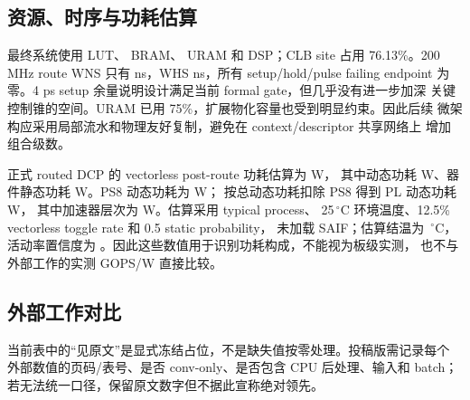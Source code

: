 \subsection{资源、时序与功耗估算}



最终系统使用 \LUTCount{} LUT、\BRAMCount{} BRAM、\URAMCount{} URAM 和
\DSPCount{} DSP；CLB site 占用 76.13\%。200 MHz route WNS 只有
\WNSValue{} ns，WHS \WHSValue{} ns，所有 setup/hold/pulse failing endpoint
为零。4 ps setup 余量说明设计满足当前 formal gate，但几乎没有进一步加深
关键控制锥的空间。URAM 已用 75\%，扩展物化容量也受到明显约束。因此后续
微架构应采用局部流水和物理友好复制，避免在 context/descriptor 共享网络上
增加组合级数。

正式 routed DCP 的 vectorless post-route 功耗估算为 \PostRoutePowerTotalW{} W，
其中动态功耗 \PostRoutePowerDynamicW{} W、器件静态功耗
\PostRoutePowerStaticW{} W。PS8 动态功耗为 \PostRoutePowerPSDynamicW{} W；
按总动态功耗扣除 PS8 得到 PL 动态功耗 \PostRoutePowerPLDynamicW{} W，
其中加速器层次为 \PostRoutePowerAccelDynamicW{} W。估算采用 typical process、
25\,$^\circ$C 环境温度、12.5\% vectorless toggle rate 和 0.5 static probability，
未加载 SAIF；估算结温为 \PostRoutePowerJunctionC{}\,$^\circ$C，活动率置信度为
\PostRoutePowerConfidence{}。因此这些数值用于识别功耗构成，不能视为板级实测，
也不与外部工作的实测 GOPS/W 直接比较。

\subsection{外部工作对比}



当前表中的“见原文”是显式冻结占位，不是缺失值按零处理。投稿版需记录每个
外部数值的页码/表号、是否 conv-only、是否包含 CPU 后处理、输入和 batch；
若无法统一口径，保留原文数字但不据此宣称绝对领先。


